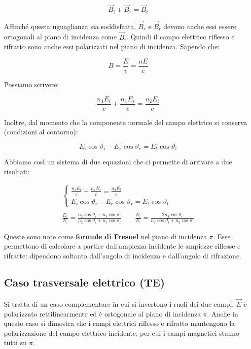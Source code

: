 \[
	\vec{B}_i + \vec{B}_r = \vec{B}_t
\]

Affinché questa uguaglianza sia soddisfatta, $\vec{B}_r$ e $\vec{B}_t$ devono anche essi essere ortogonali al piano di incidenza come $\vec{B}_i$. Quindi il campo elettrico riflesso e rifratto sono anche essi polarizzati nel piano di incidenza. Sapendo che:

\[
	B=\frac{E}{v}=\frac{nE}{c}
\]

Possiamo scrivere:

\[
	\frac{n_1E_i}{c} + \frac{n_1E_r}{c} = \frac{n_2E_t}{c}
\]

Inoltre, dal momento che la componente normale del campo elettrico si conserva (condizioni al contorno):

\[
	E_i\cos \vartheta_i - E_r\cos \vartheta_r = E_t\cos \vartheta_t
\]

Abbiamo così un sistema di due equazioni che ci permette di arrivare a due risultati:

\begin{gather*}
	\left\{ \begin{array}{l}
	 	\frac{n_1E_i}{c} + \frac{n_1E_r}{c} = \frac{n_2E_t}{c} \\
		E_i\cos \vartheta_i - E_r\cos \vartheta_r = E_t\cos \vartheta_t
	\end{array} \right.\\\\
	\boxed{\frac{E_r}{E_i} = \frac{n_2\cos \vartheta_i-n_1\cos \vartheta_t}{n_2\cos \vartheta_i + n_1\cos \vartheta_t}}\qquad
	\boxed{\frac{E_t}{E_i} = \frac{2n_1\cos \vartheta_i}{n_1\cos \vartheta_t + n_2\cos \vartheta_i}}
\end{gather*}

Queste sono note come \textbf{formule di Fresnel} nel piano di incidenza $\pi$. Esse permettono di calcolare a partire dall'ampiezza incidente le ampiezze riflesse e rifratte: dipendono soltanto dall'angolo di incidenza e dall'angolo di rifrazione.

\subsection{Caso trasversale elettrico (TE)}

Si tratta di un caso complementare in cui si invertono i ruoli dei due campi. $\vec{E}$ è polarizzato rettilinearmente ed è ortogonale al piano di incidenza $\pi$. Anche in questo caso si dimostra che i campi elettrici riflesso e rifratto mantengono la polarizzazione del campo elettrico incidente, per cui i campi magnetici stanno tutti su $\pi$.

